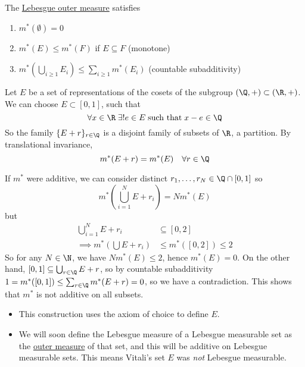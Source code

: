 \documentclass{article}
\newcommand{\1}[1]{\mathbbm{1}_{#1}}
\begin{document}
The \hyperlink{def:lebOutMeas}{Lebesgue outer measure} satisfies
\begin{enumerate}
    \item $m^*(\emptyset) = 0$
    \item $m^*(E) \leq m^*(F)$ if $E \subseteq F$ (monotone)
    \item $m^*\left(\bigcup_{i \geq 1} E_i\right) \leq \sum_{i \geq 1} m^* (E_i)$ (countable subadditivity)
\end{enumerate}

\begin{eg}
    Let $E$ be a set of representations of the cosets of the subgroup $(\Q, +) \subset (\R, +)$. We can choose $E \subset [0, 1]$, such that
    \begin{equation*}
        \forall x \in \R \; \exists! e \in E \; \text{such that} \; x - e \in \Q
    \end{equation*}
    So the family $\{E + r\}_{r \in \Q}$ is a disjoint family of subsets of $\R$, a partition.
    By translational invariance, \begin{equation*}m^*(E + r) = m^*(E) \quad \forall r \in \Q\end{equation*}

    If $m^*$ were additive, we can consider distinct $r_1, \dotsc, r_N \in \Q \cap [0, 1]$ so
    \begin{equation*}
        m^*\left(\bigcup_{i=1}^N E + r_i\right) = N m^*(E)
    \end{equation*}
    but
    \begin{align*}
        \bigcup_{i=1}^N E + r_i &\subseteq [0, 2] \\
        \implies m^*\left(\bigcup E + r_i\right) &\leq m^*([0, 2]) \leq 2
    \end{align*}
    So for any $N \in \N$, we have $N m^*(E) \leq 2$, hence $m^*(E) = 0$.
    On the other hand, $[0, 1] \subseteq \bigcup_{r \in \Q} E + r$, so by countable subadditivity $1 = m^*([0, 1]) \leq \sum_{r \in \Q} m^*(E + r) = 0$, so we have a contradiction.
    This shows that $m^*$ is not additive on all subsets.
\end{eg}

\begin{remark} \leavevmode
    \begin{itemize}
        \item This construction uses the axiom of choice to define $E$.
        \item We will soon define the Lebesgue measure of a Lebesgue measurable set as the \hyperlink{def:lebOutMeas}{outer measure} of that set, and this will be additive on Lebesgue measurable sets.  This means Vitali's set $E$ was \emph{not} Lebesgue measurable.
    \end{itemize}
\end{remark}
\end{document}

